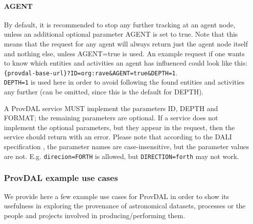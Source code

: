 \paragraph{AGENT}
By default, it is recommended to stop any further tracking at an agent node, unless an additional optional parameter AGENT is set to true. Note that this means that the request for any agent will always return just the agent node itself and nothing else, unless AGENT=true is used. An example request if one wants to know which entities and activities an agent has influenced could look like this:\\\texttt{\{provdal-base-url\}?ID=org:rave\&AGENT=true\&DEPTH=1}.\\
\texttt{DEPTH=1} is used here in order to avoid following the found entities and activities any further (can be omitted, since this is the default for DEPTH).
\newline



A ProvDAL service MUST implement the parameters ID, DEPTH and FORMAT; the remaining parameters are optional.
If a service does not implement the optional parameters, but they appear in the request, then the service should return with an error.
Please note that according to the DALI specification \citep{std:DALI}, the parameter names are case-insensitive, but the parameter values are not. E.g. \texttt{direcion=FORTH} is allowed, but \texttt{DIRECTION=forth} may not work.


\subsubsection{ProvDAL example use cases}
We provide here a few example use cases for ProvDAL in order to show its usefulness in exploring the provenance
of astronomical datasets, processes or the people and projects involved in producing/performing them.

